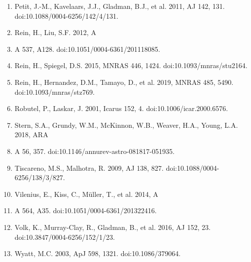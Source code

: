 \documentclass[12pt]{article}
\begin{document}
\begin{enumerate}
\item Petit, J.-M., Kavelaars, J.J., Gladman, B.J., et al. 2011, AJ 142, 131. doi:10.1088/0004-6256/142/4/131.
\item Rein, H., Liu, S.F. 2012, A
\item A 537, A128. doi:10.1051/0004-6361/201118085.
\item Rein, H., Spiegel, D.S. 2015, MNRAS 446, 1424. doi:10.1093/mnras/stu2164.
\item Rein, H., Hernandez, D.M., Tamayo, D., et al. 2019, MNRAS 485, 5490. doi:10.1093/mnras/stz769.
\item Robutel, P., Laskar, J. 2001, Icarus 152, 4. doi:10.1006/icar.2000.6576.
\item Stern, S.A., Grundy, W.M., McKinnon, W.B., Weaver, H.A., Young, L.A. 2018, ARA
\item A 56, 357. doi:10.1146/annurev-astro-081817-051935.
\item Tiscareno, M.S., Malhotra, R. 2009, AJ 138, 827. doi:10.1088/0004-6256/138/3/827.
\item Vilenius, E., Kiss, C., Müller, T., et al. 2014, A
\item A 564, A35. doi:10.1051/0004-6361/201322416.
\item Volk, K., Murray-Clay, R., Gladman, B., et al. 2016, AJ 152, 23. doi:10.3847/0004-6256/152/1/23.
\item Wyatt, M.C. 2003, ApJ 598, 1321. doi:10.1086/379064.
\end{enumerate}
\end{document}

